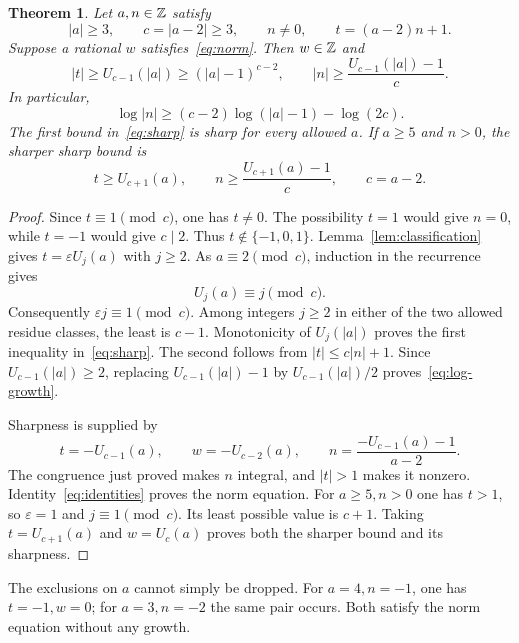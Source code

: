 \documentclass[11pt,a4paper]{article}
\newtheorem{theorem}{Theorem}[section]
\begin{document}
\begin{theorem}\label{thm:compression}
Let $a,n\in\mathbb Z$ satisfy
\[
 |a|\ge3,\qquad c=|a-2|\ge3,\qquad n\ne0,
 \qquad t=(a-2)n+1.
\]
Suppose a rational $w$ satisfies~\eqref{eq:norm}. Then $w\in\mathbb Z$ and
\begin{equation}\label{eq:sharp}
 |t|\ge U_{c-1}(|a|)\ge(|a|-1)^{c-2},\qquad
 |n|\ge\frac{U_{c-1}(|a|)-1}{c}.
\end{equation}
In particular,
\begin{equation}\label{eq:log-growth}
 \log|n|\ge(c-2)\log(|a|-1)-\log(2c).
\end{equation}
The first bound in~\eqref{eq:sharp} is sharp for every allowed $a$.
If $a\ge5$ and $n>0$, the sharper sharp bound is
\begin{equation}\label{eq:positive}
 t\ge U_{c+1}(a),\qquad
 n\ge\frac{U_{c+1}(a)-1}{c},\qquad c=a-2.
\end{equation}
\end{theorem}
\begin{proof}
Since $t\equiv1\pmod c$, one has $t\ne0$. The possibility $t=1$
would give $n=0$, while $t=-1$ would give $c\mid2$. Thus
$t\notin\{-1,0,1\}$. Lemma~\ref{lem:classification} gives
$t=\varepsilon U_j(a)$ with $j\ge2$.
As $a\equiv2\pmod c$, induction in the recurrence gives
\[
                              U_j(a)\equiv j\pmod c.
\]
Consequently $\varepsilon j\equiv1\pmod c$. Among integers $j\ge2$
in either of the two allowed residue classes, the least is $c-1$.
Monotonicity of $U_j(|a|)$ proves the first inequality in~\eqref{eq:sharp}.
The second follows from $|t|\le c|n|+1$. Since
$U_{c-1}(|a|)\ge2$, replacing $U_{c-1}(|a|)-1$ by
$U_{c-1}(|a|)/2$ proves~\eqref{eq:log-growth}.

Sharpness is supplied by
\[
 t=-U_{c-1}(a),\qquad w=-U_{c-2}(a),\qquad
 n=\frac{-U_{c-1}(a)-1}{a-2}.
\]
The congruence just proved makes $n$ integral, and $|t|>1$ makes it
nonzero. Identity~\eqref{eq:identities} proves the norm equation.
For $a\ge5,n>0$ one has $t>1$, so $\varepsilon=1$ and
$j\equiv1\pmod c$. Its least possible value is $c+1$.
Taking $t=U_{c+1}(a)$ and $w=U_c(a)$ proves both the sharper bound
and its sharpness.
\end{proof}

The exclusions on $a$ cannot simply be dropped. For $a=4,n=-1$,
one has $t=-1,w=0$; for $a=3,n=-2$ the same pair occurs.
Both satisfy the norm equation without any growth.
\end{document}
